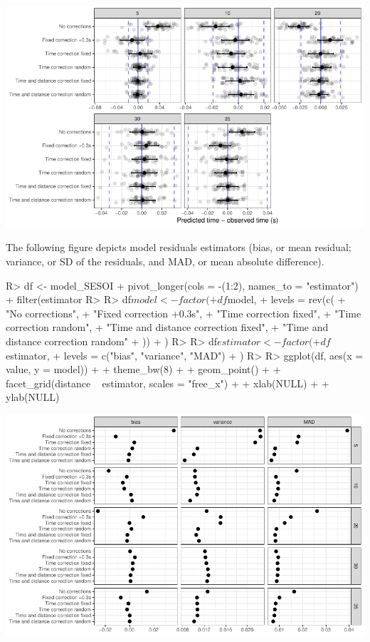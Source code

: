 \documentclass[
]{jss}
\begin{document}
\begin{CodeChunk}
\begin{center}\includegraphics[width=1\linewidth]{paper_files/figure-latex/unnamed-chunk-63-1} \end{center}

\end{CodeChunk}

The following figure depicts model residuals estimators (bias, or mean residual; variance, or SD of the residuals, and MAD, or mean absolute difference).

\begin{CodeChunk}
\begin{CodeInput}
R> df <- model_SESOI %
+   pivot_longer(cols = -(1:2), names_to = "estimator") %
+   filter(estimator %
R> 
R> df$model <- factor(
+   df$model,
+   levels = rev(c(
+     "No corrections",
+     "Fixed correction +0.3s",
+     "Time correction fixed",
+     "Time correction random",
+     "Time and distance correction fixed",
+     "Time and distance correction random"
+   ))
+ )
R> 
R> df$estimator <- factor(
+   df$estimator,
+   levels = c("bias", "variance", "MAD")
+ )
R> 
R> ggplot(df, aes(x = value, y = model)) +
+   theme_bw(8) +
+   geom_point() +
+   facet_grid(distance ~ estimator, scales = "free_x") +
+   xlab(NULL) +
+   ylab(NULL)
\end{CodeInput}


\begin{center}\includegraphics[width=1\linewidth]{paper_files/figure-latex/unnamed-chunk-64-1} \end{center}

\end{CodeChunk}
\end{document}
